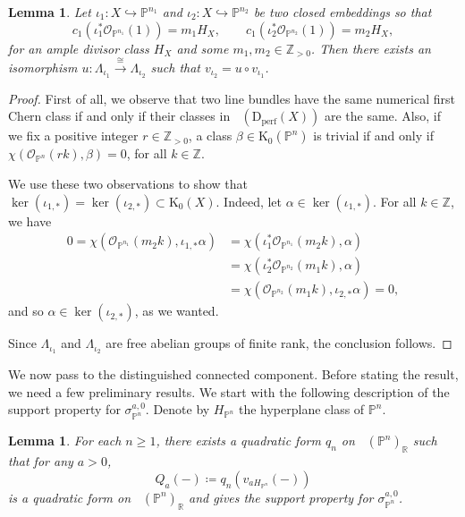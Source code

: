\documentclass[11pt, reqno]{amsart}
\numberwithin{equation}{section}
\theoremstyle{plain}
\newtheorem{lemma}[theorem]{Lemma}
\theoremstyle{remark}
\theoremstyle{definition}
\theoremstyle{italicsname}
\newcommand{\Dperf}{\mathrm{D}_{\mathrm{perf}}}
\newcommand{\num}{\mathrm{num}}
\DeclareMathOperator{\Knum}{\rK_{\num}}
\newcommand{\cO}{\mathcal{O}}
\newcommand{\rK}{\mathrm{K}}
\def\RR{\ensuremath{\mathbb{R}}}
\def\ZZ{\ensuremath{\mathbb{Z}}}
\def\PP{\ensuremath{\mathbb{P}}}
\begin{document}
\begin{lemma}\label{lem:NumericalData Equal}
Let $\iota_1\colon X\hookrightarrow\PP^{n_1}$ and $\iota_2\colon X\hookrightarrow\PP^{n_2}$ be two closed embeddings so that
\[
c_1(\iota^*_{1}\cO_{\PP^{n_1}}(1))=m_1 H_X,\qquad c_1(\iota^*_{2}\cO_{\PP^{n_2}}(1))=m_2 H_X,
\]
for an ample divisor class $H_X$ and some $m_1,m_2\in \ZZ_{>0}$. 
Then there exists an isomorphism $u\colon\Lambda_{\iota_1}\xrightarrow{\cong}\Lambda_{\iota_2}$ such that $v_{\iota_2}=u\circ v_{\iota_1}$.
\end{lemma}

\begin{proof}
First of all, we observe that two line bundles have the same numerical first Chern class if and only if their classes in $\Knum(\Dperf(X))$ are the same.
Also, if we fix a positive integer $r\in\ZZ_{>0}$, a class $\beta\in\rK_0(\PP^n)$ is trivial if and only if $\chi(\cO_{\PP^n}(rk),\beta)=0$, for all $k\in\ZZ$. 

We use these two observations to show that $\ker(\iota_{1,*})=\ker(\iota_{2,*})\subset\rK_0(X)$.
Indeed, let $\alpha\in\ker(\iota_{1,*})$.
For all $k\in\ZZ$, we have
\begin{equation*}
\begin{split}
0=\chi(\cO_{\PP^{n_1}}(m_2k),\iota_{1,*}\alpha)&=\chi(\iota_1^*\cO_{\PP^{n_1}}(m_2k),\alpha)\\
&=\chi(\iota_2^*\cO_{\PP^{n_2}}(m_1k),\alpha)\\
&=\chi(\cO_{\PP^{n_2}}(m_1k),\iota_{2,*}\alpha)=0,
\end{split}
\end{equation*}
and so $\alpha\in\ker(\iota_{2,*})$, as we wanted.

Since $\Lambda_{\iota_1}$ and $\Lambda_{\iota_2}$ are free abelian groups of finite rank, the conclusion follows.
\end{proof}

We now pass to the distinguished connected component.
Before stating the result, we need a few preliminary results.
We start with the following description of the support property for $\sigma^{a,0}_{\PP^n}$. 
Denote by $H_{\PP^n}$ the hyperplane class of $\PP^n$.

\begin{lemma}\label{lem:formula-support}
For each $n\geq 1$, there exists a quadratic form $q_n$ on $\Knum(\PP^n)_{\RR}$ such that for any $a>0$, 
\[
Q_a(-)\coloneqq q_n(v_{aH_{\PP^n}}(-))
\]
is a quadratic form on $\Knum(\PP^n)_{\RR}$ and gives the support property for $\sigma_{\PP^n}^{a,0}$.
\end{lemma}
\end{document}
